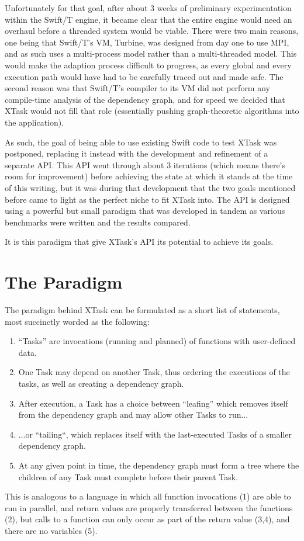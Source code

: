 \documentclass{article}
\begin{document}
Unfortunately for that goal, after about 3 weeks of preliminary experimentation within the Swift/T engine, it became clear that the entire engine would need an overhaul before a threaded system would be viable. There were two main reasons, one being that Swift/T's VM, Turbine, was designed from day one to use MPI, and as such uses a multi-process model rather than a multi-threaded model. This would make the adaption process difficult to progress, as every global and every execution path would have had to be carefully traced out and made safe. The second reason was that Swift/T's compiler to its VM did not perform any compile-time analysis of the dependency graph, and for speed we decided that XTask would not fill that role (essentially pushing graph-theoretic algorithms into the application).

As such, the goal of being able to use existing Swift code to test XTask was postponed, replacing it instead with the development and refinement of a separate API. This API went through about 3 iterations (which means there's room for improvement) before achieving the state at which it stands at the time of this writing, but it was during that development that the two goals mentioned before came to light as the perfect niche to fit XTask into. The API is designed using a powerful but small paradigm that was developed in tandem as various benchmarks were written and the results compared.

It is this paradigm that give XTask's API its potential to achieve its goals.

\section{The Paradigm}
The paradigm behind XTask can be formulated as a short list of statements, most succinctly worded as the following:
\begin{enumerate}
    \item ``Tasks'' are invocations (running and planned) of functions with user-defined data.
    \item One Task may depend on another Task, thus ordering the executions of the tasks, as well as creating a dependency graph.
    \item After execution, a Task has a choice between ``leafing'' which removes itself from the dependency graph and may allow other Tasks to run...
    \item ...or ``tailing``, which replaces itself with the last-executed Tasks of a smaller dependency graph.
    \item At any given point in time, the dependency graph must form a tree where the children of any Task must complete before their parent Task.
\end{enumerate}
This is analogous to a language in which all function invocations (1) are able to run in parallel, and return values are properly transferred between the functions (2), but calls to a function can only occur as part of the return value (3,4), and there are no variables (5).
\end{document}
